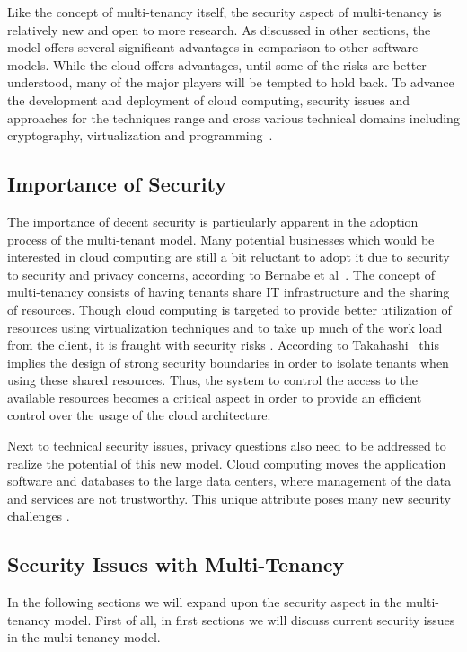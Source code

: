 Like the concept of multi-tenancy itself, the security aspect of multi-tenancy is relatively new and open to more research. 
As discussed in other sections, the model offers several significant advantages in comparison to other software models. 
While the cloud offers advantages, until some of the risks are better understood, many of the major players will be tempted to hold back. 
To advance the development and deployment of cloud computing, security issues and approaches for the techniques range and cross various technical domains including cryptography, virtualization and programming~\cite{Takahashi2012Security}.

\subsection{Importance of Security}
The importance of decent security is particularly apparent in the adoption process of the multi-tenant model. 
Many potential businesses which would be interested in cloud computing are still a bit reluctant to adopt it due to security to security and privacy concerns, according to Bernabe et al~\cite{Bernabe2012Auth}. 
The concept of multi-tenancy consists of having tenants share IT infrastructure and the sharing of resources. 
Though cloud computing is targeted to provide better utilization of resources using virtualization techniques and to take up much of the work load from the client, it is fraught with security risks . 
According to Takahashi~\cite{Takahashi2012Security} this implies the design of strong security boundaries in order to isolate tenants when using these shared resources. 
Thus, the system to control the access to the available resources becomes a critical aspect in order to provide an efficient control over the usage of the cloud architecture.

Next to technical security issues, privacy questions also need to be addressed to realize the potential of this new model. 
Cloud computing moves the application software and databases to the large data centers, where management of the data and services are not trustworthy. 
This unique attribute poses many new security challenges . 

\subsection{Security Issues with Multi-Tenancy}
In the following sections we will expand upon the security aspect in the multi-tenancy model. 
First of all, in first sections we will discuss current security issues in the multi-tenancy model.

